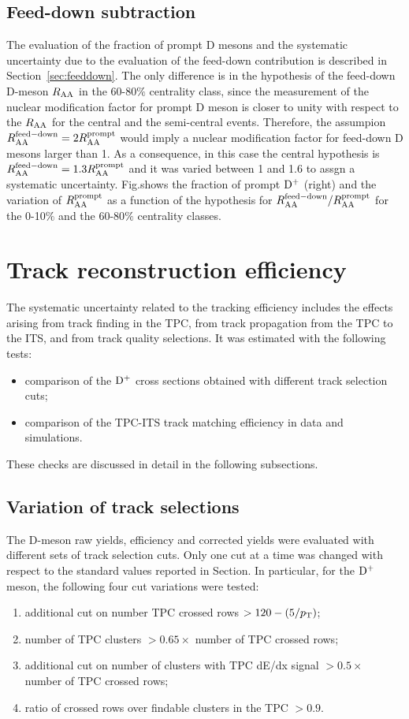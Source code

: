 \subsection{Feed-down subtraction}
The evaluation of the fraction of prompt D mesons and the systematic uncertainty due to the evaluation of the feed-down contribution is described in Section~\ref{sec:feeddown}. The only difference is in the hypothesis of the feed-down D-meson $R_{\rm AA}$ in the 60-80$\%$ centrality class, since the measurement of the nuclear modification factor for prompt D meson is closer to unity with respect to the $R_{\rm AA}$ for the central and the semi-central events. Therefore, the assumpion $R_{\rm AA}^{\rm feed-down}=2R_{\rm AA}^{\rm prompt}$ would imply a nuclear modification factor for feed-down D mesons larger than 1. As a consequence, in this case the central hypothesis is $R_{\rm AA}^{\rm feed-down}=1.3R_{\rm AA}^{\rm prompt}$ and it was varied between 1 and 1.6 to assgn a systematic uncertainty.
Fig.shows the fraction of prompt ${\rm D^+}$ (right) and the variation of $R_{\rm AA}^{\rm prompt}$ as a function of the hypothesis for  $R_{\rm AA}^{\rm feed-down}/R_{\rm AA}^{\rm prompt}$ for the 0-10$\%$ and the 60-80$\%$ centrality classes.

\section{Track reconstruction efficiency}
\label{sec:TrackCutsUnc_3050}
The systematic uncertainty related to the tracking efficiency includes the 
effects arising from track finding in the TPC, from track propagation  
from the TPC to the ITS, and from track quality selections.
It was estimated with the following tests:
\begin{itemize}
\item comparison of the ${\rm D^+}$ cross sections obtained with different track selection cuts;
\item comparison of the TPC-ITS track matching efficiency in data and simulations.
\end{itemize}
These checks are discussed in detail in the following subsections.

\subsection{Variation of track selections}

The D-meson raw yields, efficiency and corrected yields were evaluated with 
different sets of track selection cuts.
Only one cut at a time was changed with respect to the standard values 
reported in Section.
In particular, for the ${\rm D^+}$ meson, the following four cut variations were 
tested:
\begin{enumerate}
\item additional cut on number TPC crossed rows $> 120-(5/p_{\rm T})$;
\item number of TPC clusters $>0.65 \times$ number of TPC crossed rows;
\item additional cut on number of clusters with TPC dE/dx signal $> 0.5 \times$ number of TPC crossed rows;
\item ratio of crossed rows over findable clusters in the TPC $>0.9$.
\end{enumerate}


